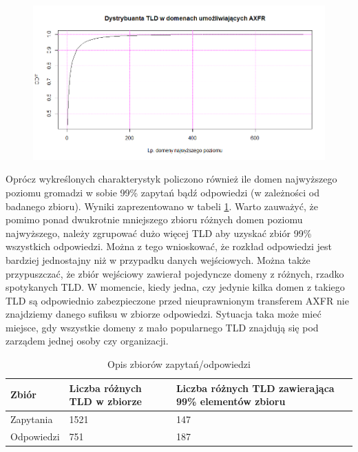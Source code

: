 \begin{figure}[ht]
	\centering
	\includegraphics[width=1.0\textwidth]{image/cdf_tld_resp}
	\caption{}
	\label{cdf_tld_resp}
\end{figure}


Oprócz wykreślonych charakterystyk policzono również ile domen najwyższego poziomu gromadzi w sobie 99\% zapytań bądź odpowiedzi (w zależności od badanego zbioru). Wyniki zaprezentowano w tabeli \ref{cdf_table}. Warto zauważyć, że pomimo ponad dwukrotnie mniejszego zbioru różnych domen poziomu najwyższego, należy zgrupować dużo więcej TLD aby uzyskać zbiór 99\% wszystkich odpowiedzi. Można z tego wnioskować, że rozkład odpowiedzi jest bardziej jednostajny niż w przypadku danych wejściowych. Można także przypuszczać, że zbiór wejściowy zawierał pojedyncze domeny z różnych, rzadko spotykanych TLD. W momencie, kiedy jedna, czy jedynie kilka domen z takiego TLD są odpowiednio zabezpieczone przed nieuprawnionym transferem AXFR nie znajdziemy danego sufiksu w zbiorze odpowiedzi. Sytuacja taka może mieć miejsce, gdy wszystkie domeny z mało popularnego TLD znajdują się pod zarządem jednej osoby czy organizacji.

\begin{table}[!hb]
	\centering
	\caption{Opis zbiorów zapytań/odpowiedzi}
	\label{cdf_table}
	\begin{tabular}{|p{}|p{}|p{}|}
		\hline
		\textbf{Zbiór} & 
		\textbf{Liczba różnych TLD w zbiorze} & 
		\textbf{Liczba różnych TLD zawierająca 99\% elementów zbioru} \\
		\hline\hline
		Zapytania & 
		1521 & 
		147\\
		\hline
		Odpowiedzi & 
		751 & 
		187\\
		\hline\hline		
	\end{tabular}
\end{table}

